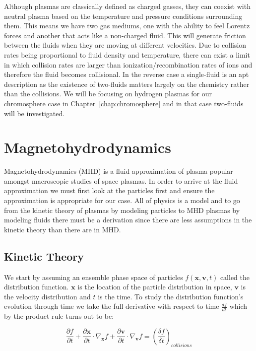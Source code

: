 \documentclass[12pt,upcase]{umlthesis}
\begin{document}
Although plasmas are classically defined as charged gasses, they can coexist with neutral plasma based on the temperature and pressure conditions surrounding them. This means we have two gas mediums, one with the ability to feel Lorentz forces and another that acts like a non-charged fluid. This will generate friction between the fluids when they are moving at different velocities. Due to collision rates being proportional to fluid density and temperature, there can exist a limit in which collision rates are larger than ionization/recombination rates of ions and therefore the fluid becomes collisional. In the reverse case a single-fluid is an apt description as the existence of two-fluids matters largely on the chemistry rather than the collisions. We will be focusing on hydrogen plasmas for our chromosphere case in Chapter~\ref{chap:chromosphere} and in that case two-fluids will be investigated.

\section{Magnetohydrodynamics}\label{sec:mhd}

Magnetohydrodynamics (MHD) is a fluid approximation of plasma popular amongst macroscopic studies of space plasmas. In order to arrive at the fluid approximation we must first look at the particles first and ensure the approximation is appropriate for our case. All of physics is a model and to go from the kinetic theory of plasmas by modeling particles to MHD plasmas by modeling fluids there must be a derivation since there are less assumptions in the kinetic theory than there are in MHD\@.

\subsection{Kinetic Theory}\label{sec:kinetictheory}

We start by assuming an ensemble phase space of particles $f(\textbf{x}, \textbf{v}, t)$ called the distribution function. $\textbf{x}$ is the location of the particle distribution in space, $\textbf{v}$ is the velocity distribution and $t$ is the time. To study the distribution function's evolution through time we take the full derivative with respect to time $\frac{df}{dt}$ which by the product rule turns out to be:

\begin{equation}
	\frac{\partial f}{\partial t} + \frac{\partial \textbf{x}}{\partial t} \cdot \nabla_{\textbf{x}} f + \frac{\partial \textbf{v}}{\partial t} \cdot \nabla_{\textbf{v}} f = {(\frac{\delta f}{\delta t})}_{collisions}
\end{equation}
\end{document}
